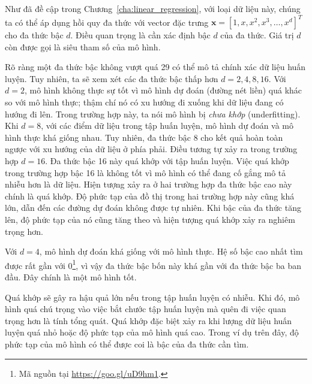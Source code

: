Như đã đề cập trong Chương~\ref{cha:linear_regression}, với loại dữ liệu này,
chúng ta có thể áp dụng hồi quy đa thức với vector đặc trưng
$\mathbf{x} = [1, x, x^2, x^3, \dots, x^d]^T$ cho đa thức bậc $d$. Điều quan
trọng là cần xác định bậc $d$ của đa thức. Giá trị $d$ còn được gọi là siêu tham số của mô hình. 
 
Rõ ràng một đa thức bậc không vượt quá 29 có thể mô tả chính xác dữ liệu huấn
luyện. Tuy nhiên, ta sẽ xem xét các đa thức bậc thấp hơn $d = 2, 4, 8, 16$. Với
$d = 2$, mô hình không thực sự tốt vì mô hình dự đoán (đường nét liền) quá khác
so với {mô hình thực}; thậm chí nó có xu hướng đi xuống khi dữ liệu đang
có hướng đi lên. Trong trường hợp này, ta nói mô hình bị \textit{chưa khớp} (underfitting).
Khi $d = 8$, với các điểm dữ liệu trong tập huấn luyện, mô hình dự đoán và mô
hình thực khá giống nhau. Tuy nhiên, đa thức bậc 8 cho kết quả hoàn toàn ngược
với {xu hướng của dữ liệu} ở phía phải. Điều tương tự xảy ra trong trường hợp $d
= 16$. Đa thức bậc 16 này quá khớp với tập huấn luyện. Việc quá khớp
trong trường hợp bậc 16 là không tốt vì mô hình có thể đang cố gắng mô tả
{nhiễu} hơn là dữ liệu. Hiện tượng xảy ra ở hai trường hợp đa thức bậc
cao này chính là quá khớp. Độ phức tạp của đồ thị trong hai
trường hợp này cũng khá lớn, dẫn đến các đường dự đoán không được tự nhiên. Khi bậc của đa thức tăng lên, độ phức tạp của nó cũng tăng theo và hiện tượng quá khớp xảy ra nghiêm trọng hơn. 
 
 
Với $d = 4$, mô hình dự đoán khá giống với mô hình thực. Hệ số bậc cao nhất tìm
được rất gần với 0\footnote{Mã nguồn tại \url{https://goo.gl/uD9hm1}.}, vì
vậy đa thức bậc bốn này khá gần với đa thức bậc ba ban đầu. Đây chính là một mô
hình tốt.

 
Quá khớp sẽ gây ra hậu quả lớn nếu trong tập huấn luyện có nhiễu. Khi
đó, mô hình quá chú trọng vào việc bắt chước tập huấn luyện mà quên đi việc
quan trọng hơn là tính tổng quát. Quá khớp đặc biệt xảy ra khi lượng dữ liệu huấn
luyện quá nhỏ hoặc độ phức tạp của mô hình quá cao. Trong ví dụ trên đây, độ
phức tạp của mô hình có thể được coi là bậc của đa thức cần tìm.

 
